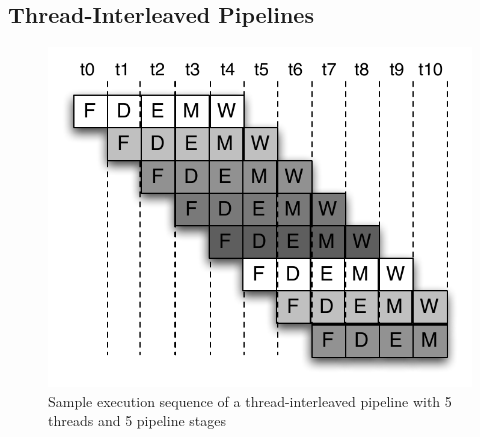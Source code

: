 \subsection{Thread-Interleaved Pipelines}
\label{subsection:pret_thread_pipeline}
\begin{figure}
  \vspace{-20pt}
  \begin{center}
    \includegraphics[scale=.65]{figs/thread-interleaved-execution}
  \end{center}
  \vspace{-20pt}
  \caption{Sample execution sequence of a thread-interleaved pipeline with 5 threads and 5 pipeline stages}
  \label{fig:execution_thread_interleaved_pipeline}
\end{figure}
